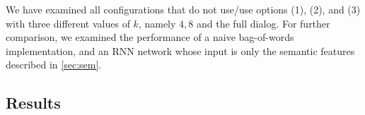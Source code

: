 We have examined all configurations that do not use/use options 
(1), (2), and (3) with three different values of $k$, namely $4,8$ and 
the full dialog. 
For further comparison, we examined the performance of a naive bag-of-words 
implementation, and an RNN network whose input is only the semantic features described in \ref{sec:sem}. 





\subsection{Results}

